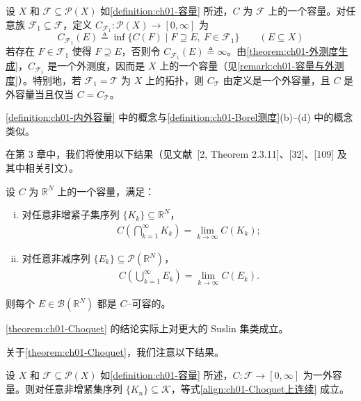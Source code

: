 \documentclass[../../main.tex]{subfiles}%
\begin{document}
\begin{remark}\label{remark:ch01-容量生成}
设 $X$ 和 $\mathcal{F}\subseteq\mathcal{P}(X)$ 如\cref{definition:ch01-容量} 所述，$C$ 为 $\mathcal{F}$ 上的一个容量。对任意族 $\mathcal{F}_1\subseteq\mathcal{F}$，定义 $C_{\mathcal{F}_1}:\mathcal{P}(X)\to[0,\infty]$ 为
\[
C_{\mathcal{F}_1}(E)\triangleq \inf\{C(F)\mid F\supseteq E,\ F\in\mathcal{F}_1\}\qquad(E\subseteq X)
\]
若存在 $F\in\mathcal{F}_1$ 使得 $F\supseteq E$，否则令 $C_{\mathcal{F}_1}(E)\triangleq \infty$。由\cref{theorem:ch01-外测度生成}，$C_{\mathcal{F}_1}$ 是一个外测度，因而是 $X$ 上的一个容量（见\cref{remark:ch01-容量与外测度}）。特别地，若 $\mathcal{F}_1=\mathcal{T}$ 为 $X$ 上的拓扑，则 $C_{\mathcal{T}}$ 由定义是一个外容量，且 $C$ 是外容量当且仅当 $C=C_{\mathcal{T}}$。

\cref{definition:ch01-内外容量} 中的概念与\cref{definition:ch01-Borel测度}(b)--(d) 中的概念类似。
\end{remark}

在第 3 章中，我们将使用以下结果（见文献~[2, Theorem 2.3.11]、[32]、[109] 及其中相关引文）。

\begin{theorem}[Choquet]\label{theorem:ch01-Choquet}
设 $C$ 为 $\mathbb{R}^N$ 上的一个容量，满足：
\begin{enumerate}[(i)]
\item 对任意非增紧子集序列 $\{K_k\}\subseteq\mathbb{R}^N$，
\begin{align}
C\left(\bigcap_{k=1}^\infty K_k\right)=\lim_{k\to\infty}C(K_k); \label{align:ch01-Choquet上连续}
\end{align}
\item 对任意非减序列 $\{E_k\}\subseteq\mathcal{P}(\mathbb{R}^N)$，
\begin{align}
C\left(\bigcup_{k=1}^\infty E_k\right)=\lim_{k\to\infty}C(E_k). \label{align:ch01-Choquet下连续}
\end{align}
\end{enumerate}
则每个 $E\in\mathcal{B}(\mathbb{R}^N)$ 都是 $C$--可容的。
\end{theorem}

\begin{remark}\label{remark:ch01-Suslin集}
\cref{theorem:ch01-Choquet} 的结论实际上对更大的 Suslin 集类成立。
\end{remark}

关于\cref{theorem:ch01-Choquet}，我们注意以下结果。

\begin{proposition}\label{proposition:ch01-外容量上连续}\label{proposition:ch01-测度上连续}
设 $X$ 和 $\mathcal{F}\subseteq\mathcal{P}(X)$ 如\cref{definition:ch01-容量} 所述，$C:\mathcal{F}\to[0,\infty]$ 为一外容量。则对任意非增紧集序列 $\{K_n\}\subseteq\mathcal{K}$，等式\eqref{align:ch01-Choquet上连续} 成立。
\end{proposition}
\end{document}
